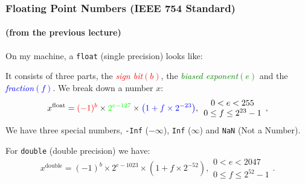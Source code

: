 \documentclass[table]{beamer}
\newif\ifschigh\schighfalse
\newcommand{\kw}[1]{\ifschigh\textcolor{red}{#1}\else\textcolor{keyword}{#1}\fi}
\begin{document}
\begin{frame}
\frametitle{Floating Point Numbers (IEEE 754 Standard)}
\framesubtitle{(from the previous lecture)}
On my machine, a \kw{\tt float} (single precision) looks like:\\
\begin{center}
\end{center}
It consists of three parts, the \textcolor{red}{\emph{sign bit}$(b)$}, the \textcolor{green}{\emph{biased exponent}$(e)$} and the \textcolor{blue}{\emph{fraction}$(f)$}.
We break down a number $x$:
$$x^{\textrm{float}} = \textcolor{red}{(-1)^b} \times 
\textcolor{green}{2^{e-127}} \times \textcolor{blue}{\left(1+f\times2^{-23}\right)},
\begin{array}{c}
0 < e < 255\\0 \leq f \leq 2^{23}-1
\end{array},$$
We have three special numbers, {\tt -Inf} ($-\infty$), {\tt Inf} ($\infty$) and {\tt NaN} (Not a Number).

For \kw{\tt double} (double precision) we have:
$$x^{\textrm{double}} = (-1)^b\times 2^{e-1023}\times\left(1+f\times2^{-52}\right),
\begin{array}{c}
0 < e < 2047\\0 \leq f \leq 2^{52}-1
\end{array}.$$
\end{frame}
\end{document}
